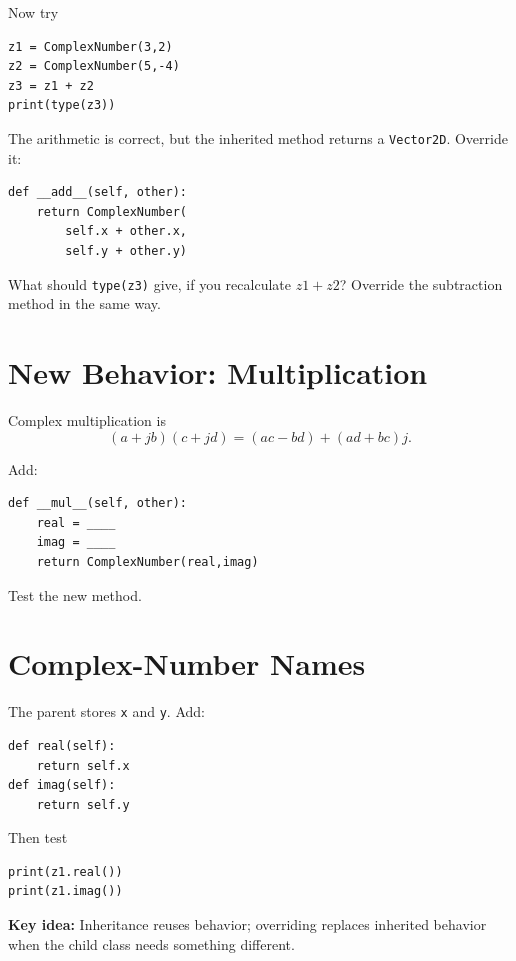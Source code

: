 \documentclass[11pt]{article}
\begin{document}
Now try

\begin{verbatim}
z1 = ComplexNumber(3,2)
z2 = ComplexNumber(5,-4)
z3 = z1 + z2
print(type(z3))
\end{verbatim}

The arithmetic is correct, but the inherited method returns a \texttt{Vector2D}. Override it:

\begin{verbatim}
def __add__(self, other):
    return ComplexNumber(
        self.x + other.x,
        self.y + other.y)
\end{verbatim}

What should \texttt{type(z3)} give, if you recalculate $z1+z2$?  Override the subtraction method in the same way.

\section{New Behavior: Multiplication}

Complex multiplication is
\[
(a+jb)(c+jd)=(ac-bd)+(ad+bc)j.
\]

Add:

\begin{verbatim}
def __mul__(self, other):
    real = ____
    imag = ____
    return ComplexNumber(real,imag)
\end{verbatim}

Test the new method.

\section{Complex-Number Names}

The parent stores \texttt{x} and \texttt{y}. Add:

\begin{verbatim}
def real(self):
    return self.x
def imag(self):
    return self.y
\end{verbatim}

Then test

\begin{verbatim}
print(z1.real())
print(z1.imag())
\end{verbatim}

\textbf{Key idea:} Inheritance reuses behavior; overriding replaces
inherited behavior when the child class needs something different.
\end{document}

